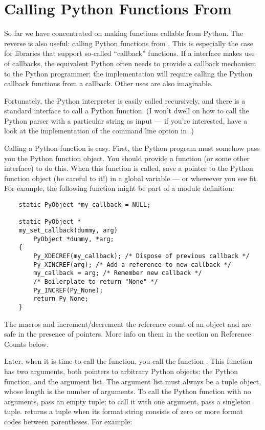 \documentclass[twoside,openright]{report}
\begin{document}
\section{Calling Python Functions From \C{}}

So far we have concentrated on making \C{} functions callable from
Python.  The reverse is also useful: calling Python functions from \C{}.
This is especially the case for libraries that support so-called
``callback'' functions.  If a \C{} interface makes use of callbacks, the
equivalent Python often needs to provide a callback mechanism to the
Python programmer; the implementation will require calling the Python
callback functions from a \C{} callback.  Other uses are also imaginable.

Fortunately, the Python interpreter is easily called recursively, and
there is a standard interface to call a Python function.  (I won't
dwell on how to call the Python parser with a particular string as
input --- if you're interested, have a look at the implementation of
the  command line option in .)

Calling a Python function is easy.  First, the Python program must
somehow pass you the Python function object.  You should provide a
function (or some other interface) to do this.  When this function is
called, save a pointer to the Python function object (be careful to
 it!) in a global variable --- or whereever you see fit.
For example, the following function might be part of a module
definition:

\bcode\begin{verbatim}
    static PyObject *my_callback = NULL;

    static PyObject *
    my_set_callback(dummy, arg)
        PyObject *dummy, *arg;
    {
        Py_XDECREF(my_callback); /* Dispose of previous callback */
        Py_XINCREF(arg); /* Add a reference to new callback */
        my_callback = arg; /* Remember new callback */
        /* Boilerplate to return "None" */
        Py_INCREF(Py_None);
        return Py_None;
    }
\end{verbatim}\ecode
%
The macros  and  increment/decrement
the reference count of an object and are safe in the presence of
\NULL{} pointers.  More info on them in the section on Reference
Counts below.

Later, when it is time to call the function, you call the \C{} function
.  This function has two arguments, both
pointers to arbitrary Python objects: the Python function, and the
argument list.  The argument list must always be a tuple object, whose
length is the number of arguments.  To call the Python function with
no arguments, pass an empty tuple; to call it with one argument, pass
a singleton tuple.   returns a tuple when its
format string consists of zero or more format codes between
parentheses.  For example:
\end{document}
